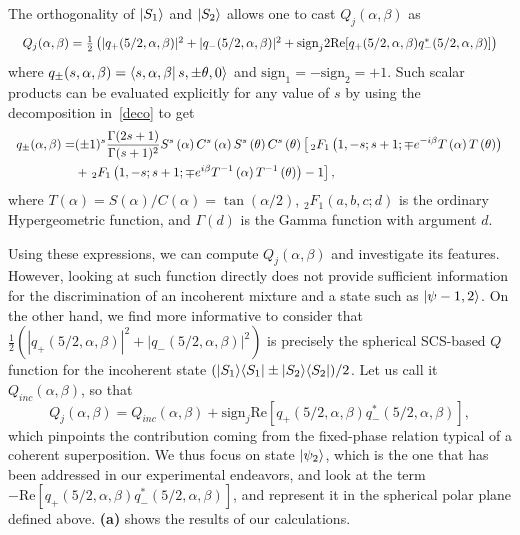 The orthogonality of $\ket{S_1}$ and $\ket{S_2}$ allows one to cast $Q_j(\alpha,\beta)$ as 
\begin{equation}\scalebox{0.9}{$
Q_j(\alpha,\beta)=\frac12\left(|q_+(5/2,\alpha,\beta)|^2+|q_-(5/2,\alpha,\beta)|^2+\text{sign}_j2\text{Re}[q_+(5/2,\alpha,\beta)q^*_-(5/2,\alpha,\beta)]\right)
$}\end{equation}
where $q_\pm(s,\alpha,\beta)=\bra{s,\alpha,\beta}{s,\pm\theta,0}\rangle$ and $\text{sign}_1=-\text{sign}_2=+1$. Such scalar products can be evaluated explicitly for any value of $s$ by using the decomposition in~\cref{deco} to get 
\begin{equation}
\scalebox{0.9}{$\begin{aligned}
q_\pm(\alpha,\beta) =
&(\pm 1)^s\frac{\Gamma (2 s+1)}{\Gamma (s+1)^2} S^s\left({\alpha }\right) C^s\left(\alpha\right) S^s\left(\theta\right) C^s\left({\theta}\right)
\left[
	\, _2F_1
	\left(
		1,-s;s+1;\mp e^{-i \beta  } T\left({\alpha}\right) T\left({\theta }\right)
	\right)
\right. \\
&+ \left.{}_2F_1
	\left(
		1,-s;s+1;\mp e^{i \beta} T^{-1} \left({\alpha}\right) T^{-1}\left({\theta }\right)
	\right)
-1\right],
\end{aligned}$}
\end{equation}
where $T(\alpha)=S(\alpha)/C(\alpha)=\tan(\alpha/2)$, $_2F_1(a,b,c;d)$ is the ordinary Hypergeometric function, and $\Gamma(d)$ is the Gamma function with argument $d$.

Using these expressions, we can compute $Q_j(\alpha,\beta)$ and investigate its features. However, looking at such function directly does not provide sufficient information for the discrimination of an incoherent mixture and a state such as $\ket{\psi-{1,2}}$. On the other hand, we find more informative to consider that $\frac12\left(|q_+(5/2,\alpha,\beta)|^2+|q_-(5/2,\alpha,\beta)|^2\right)$ is precisely the spherical SCS-based $Q$ function for the incoherent state $(\ket{S_1}\!\bra{S_1}\pm\ket{S_2}\!\bra{S_2})/2$. Let us call it $Q_{inc}(\alpha,\beta)$, so that 
\begin{equation}
Q_j(\alpha,\beta)=Q_{inc}(\alpha,\beta)+\text{sign}_j\text{Re}[q_+(5/2,\alpha,\beta)q^*_-(5/2,\alpha,\beta)],
\end{equation}
which pinpoints the contribution coming from the fixed-phase relation typical of a coherent superposition. We thus focus on state $\ket{\psi_2}$, which is the one that has been addressed in our experimental endeavors, and look at the term $-\text{Re}[q_+(5/2,\alpha,\beta)q^*_-(5/2,\alpha,\beta)]$, and represent it in the spherical polar plane defined above. \textbf{(a)} shows the results of our calculations. 

